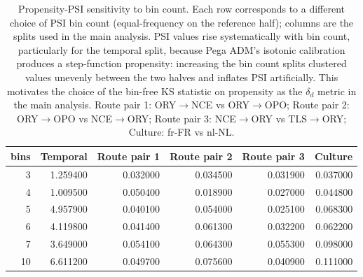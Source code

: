 \begin{table}
\caption{Propensity-PSI sensitivity to bin count. Each row corresponds to a different choice of PSI bin count (equal-frequency on the reference half); columns are the splits used in the main analysis. PSI values rise systematically with bin count, particularly for the temporal split, because Pega ADM's isotonic calibration produces a step-function propensity: increasing the bin count splits clustered values unevenly between the two halves and inflates PSI artificially. This motivates the choice of the bin-free KS statistic on propensity as the $\delta_d$ metric in the main analysis. Route pair 1: ORY$\to$NCE vs ORY$\to$OPO; Route pair 2: ORY$\to$OPO vs NCE$\to$ORY; Route pair 3: NCE$\to$ORY vs TLS$\to$ORY; Culture: fr-FR vs nl-NL.}
\label{tab:psi_bin_sensitivity_propensity}
\begin{tabular}{rrrrrr}
\toprule
bins & Temporal & Route pair 1 & Route pair 2 & Route pair 3 & Culture \\
\midrule
3 & 1.259400 & 0.032000 & 0.034500 & 0.031900 & 0.037000 \\
4 & 1.009500 & 0.050400 & 0.018900 & 0.027000 & 0.044800 \\
5 & 4.957900 & 0.040100 & 0.054000 & 0.025100 & 0.068300 \\
6 & 4.119800 & 0.041400 & 0.061300 & 0.032200 & 0.062200 \\
7 & 3.649000 & 0.054100 & 0.064300 & 0.055300 & 0.098000 \\
10 & 6.611200 & 0.049700 & 0.075600 & 0.040900 & 0.111000 \\
\bottomrule
\end{tabular}
\end{table}
